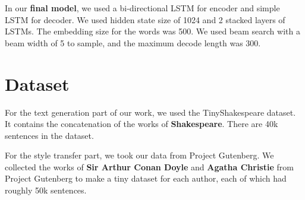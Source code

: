 \documentclass{article} %
\begin{document}
In our \textbf{final model}, we used a bi-directional LSTM for encoder and simple LSTM for decoder. We used hidden state size of 1024 and 2 stacked layers of LSTMs. The embedding size for the words was 500. We used beam search with a beam width of 5 to sample, and the maximum decode length was 300.


 
 
\section{Dataset}
For the text generation part of our work, we used the TinyShakespeare dataset. It contains the concatenation of the works of \textbf{Shakespeare}. There are  40k sentences in the dataset.
\par
For the style transfer part, we took our data from Project Gutenberg.\cite{gutenberg} We collected the works of \textbf{Sir Arthur Conan Doyle} and \textbf{Agatha Christie} from Project Gutenberg to make a tiny dataset for each author, each of which had roughly 50k sentences.
\end{document}
